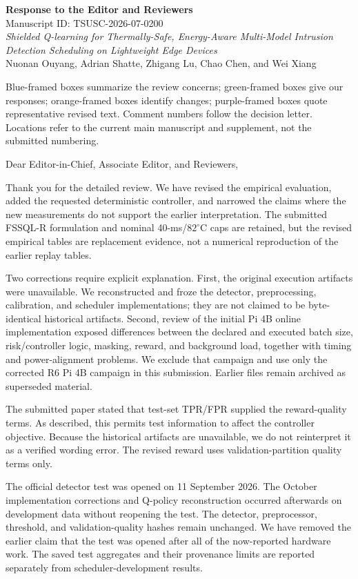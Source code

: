 \documentclass[10pt,a4paper]{article}
\begin{document}
\begin{center}
{\LARGE\bfseries Response to the Editor and Reviewers}\\[6pt]
{\large Manuscript ID: TSUSC-2026-07-0200}\\[4pt]
\emph{Shielded Q-learning for Thermally-Safe, Energy-Aware Multi-Model Intrusion Detection Scheduling on Lightweight Edge Devices}\\[4pt]
Nuonan Ouyang, Adrian Shatte, Zhigang Lu, Chao Chen, and Wei Xiang
\end{center}
\begin{tcolorbox}[colback=SoftGray,colframe=black!25,title=How to Read This Letter]
Blue-framed boxes summarize the review concerns; green-framed boxes give our responses; orange-framed boxes identify changes; purple-framed boxes quote representative revised text. Comment numbers follow the decision letter. Locations refer to the current main manuscript and supplement, not the submitted numbering.
\end{tcolorbox}
\begin{authorresponsebox}
Dear Editor-in-Chief, Associate Editor, and Reviewers,

Thank you for the detailed review. We have revised the empirical evaluation, added the requested deterministic controller, and narrowed the claims where the new measurements do not support the earlier interpretation. The submitted FSSQL-R formulation and nominal 40-ms/$82^\circ$C caps are retained, but the revised empirical tables are replacement evidence, not a numerical reproduction of the earlier replay tables.

Two corrections require explicit explanation. First, the original execution artifacts were unavailable. We reconstructed and froze the detector, preprocessing, calibration, and scheduler implementations; they are not claimed to be byte-identical historical artifacts. Second, review of the initial Pi 4B online implementation exposed differences between the declared and executed batch size, risk/controller logic, masking, reward, and background load, together with timing and power-alignment problems. We exclude that campaign and use only the corrected R6 Pi 4B campaign in this submission. Earlier files remain archived as superseded material.

The submitted paper stated that test-set TPR/FPR supplied the reward-quality terms. As described, this permits test information to affect the controller objective. Because the historical artifacts are unavailable, we do not reinterpret it as a verified wording error. The revised reward uses validation-partition quality terms only.

The official detector test was opened on 11 September 2026. The October implementation corrections and Q-policy reconstruction occurred afterwards on development data without reopening the test. The detector, preprocessor, threshold, and validation-quality hashes remain unchanged. We have removed the earlier claim that the test was opened after all of the now-reported hardware work. The saved test aggregates and their provenance limits are reported separately from scheduler-development results.
\end{authorresponsebox}
\clearpage
\end{document}
